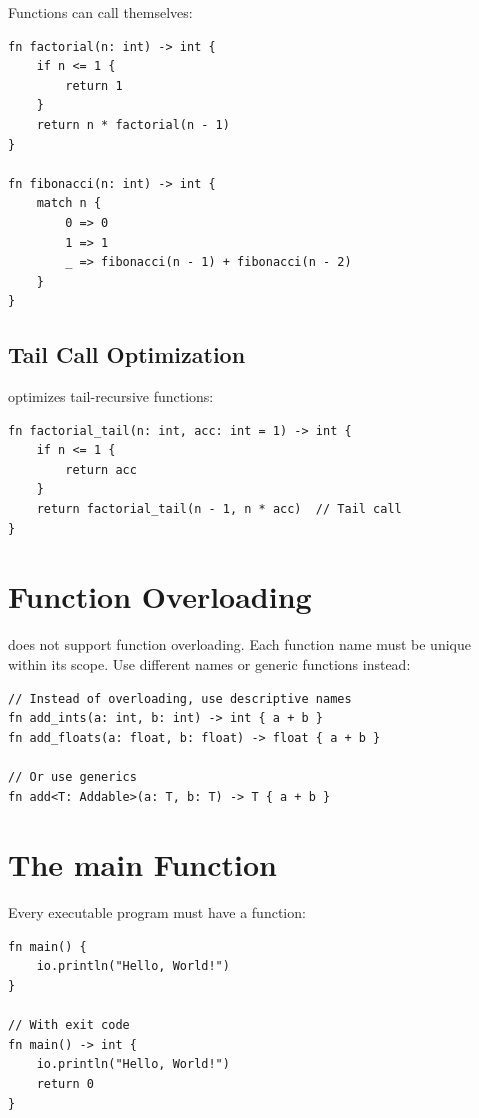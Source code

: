 Functions can call themselves:

\begin{lstlisting}
fn factorial(n: int) -> int {
    if n <= 1 {
        return 1
    }
    return n * factorial(n - 1)
}

fn fibonacci(n: int) -> int {
    match n {
        0 => 0
        1 => 1
        _ => fibonacci(n - 1) + fibonacci(n - 2)
    }
}
\end{lstlisting}

\subsection{Tail Call Optimization}

\haira{} optimizes tail-recursive functions:

\begin{lstlisting}
fn factorial_tail(n: int, acc: int = 1) -> int {
    if n <= 1 {
        return acc
    }
    return factorial_tail(n - 1, n * acc)  // Tail call
}
\end{lstlisting}

\section{Function Overloading}

\haira{} does not support function overloading. Each function name must be unique within its scope. Use different names or generic functions instead:

\begin{lstlisting}
// Instead of overloading, use descriptive names
fn add_ints(a: int, b: int) -> int { a + b }
fn add_floats(a: float, b: float) -> float { a + b }

// Or use generics
fn add<T: Addable>(a: T, b: T) -> T { a + b }
\end{lstlisting}

\section{The main Function}

Every executable \haira{} program must have a  function:

\begin{lstlisting}
fn main() {
    io.println("Hello, World!")
}

// With exit code
fn main() -> int {
    io.println("Hello, World!")
    return 0
}
\end{lstlisting}

